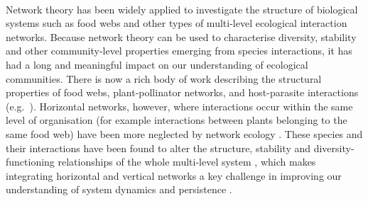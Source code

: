 \documentclass[a4,12pt]{article}
\begin{document}
    \paragraph{}
    Network theory has been widely applied to investigate the structure of biological systems such as food webs and other types of multi-level ecological interaction networks. Because network theory can be used to characterise diversity, stability and other community-level properties emerging from species interactions, it has had a long and meaningful impact on our understanding of ecological communities. There is now a rich body of work describing the structural properties of food webs, plant-pollinator networks, and host-parasite interactions (e.g.\ \cite{Lafferty2008, Thompson2012, Dunne2013, Stouffer2014, Cirtwill2015a}). Horizontal networks, however, where interactions occur within the same level of organisation (for example interactions between plants belonging to the same food web) have been more neglected by network ecology \parencite{Ellison2019}. These species and their interactions have been found to alter the structure, stability and diversity-functioning relationships of the whole multi-level system \parencite{Hammill2015, Giling2019, Zhao2019, Miele2019}, which makes integrating horizontal and vertical networks a key challenge in improving our understanding of system dynamics and persistence \parencite{Godoy2018c}.

\end{document}
